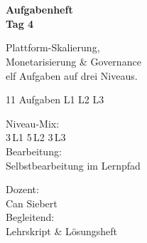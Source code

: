 \documentclass[11pt,a4paper,oneside]{article}
\begin{document}
\begin{titlepage}
  \pagestyle{empty}
  \vspace*{1.5cm}
  \\[2pt]
  \noindent{\color{lpAccent}\rule{\linewidth}{1.2pt}}\\[4pt]

  \vspace{3cm}
  {\sffamily\fontsize{30}{34}\selectfont\bfseries\color{lpInk}Aufgabenheft\\Tag 4\par}

  \vspace{0.7cm}
  {\sffamily\large\color{lpGray}Plattform-Skalierung,\\Monetarisierung \& Governance\\\textendash{} elf Aufgaben auf drei Niveaus.\par}

  \vspace{1.5cm}
  {\caveatfont\LARGE\color{lpAmber}11 Aufgaben \textperiodcentered{} L1 \textperiodcentered{} L2 \textperiodcentered{} L3}\par

  \vfill

  \noindent\begin{minipage}{0.55\linewidth}
    {\sffamily\footnotesize\color{lpGray}Niveau-Mix:}\\
    {\sffamily\small\color{lpInk}3\,\textsf{L1} \textperiodcentered{} 5\,\textsf{L2} \textperiodcentered{} 3\,\textsf{L3}}\\[10pt]
    {\sffamily\footnotesize\color{lpGray}Bearbeitung:}\\
    {\sffamily\small\color{lpInk}Selbstbearbeitung im Lernpfad}
  \end{minipage}\hfill
  \begin{minipage}{0.4\linewidth}
    \raggedleft
    {\sffamily\footnotesize\color{lpGray}Dozent:}\\
    {\sffamily\small\color{lpInk}Can Siebert}\\[10pt]
    {\sffamily\footnotesize\color{lpGray}Begleitend:}\\
    {\sffamily\small\color{lpInk}Lehrskript \& Lösungsheft}
  \end{minipage}

  \vspace{0.5cm}
  \noindent{\color{lpAccent}\rule{\linewidth}{0.6pt}}
\end{titlepage}
\end{document}
